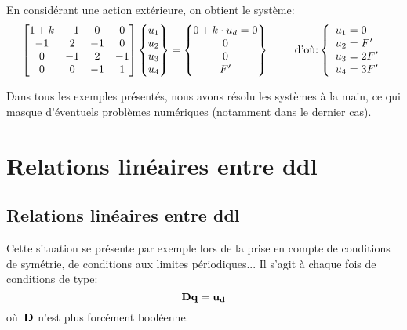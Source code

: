 \medskipvm
En considérant une action extérieure, on obtient le système:
\begin{equation}
\MM*{1+k & -1 & 0 & 0 \\ -1 & 2 & -1 & 0 \\ 0 & -1 & 2 & -1\\ 0&0&-1&1}
\VV*{u_1\\u_2\\u_3\\u_4}
=
\VV*{0+k\cdot u_d = 0\\0\\0\\F'}
\qquad \text{ d'où:} 
\left\{\begin{array}{l} u_1=0 \\ u_2=F' \\ u_3=2F' \\ u_4=3F' \end{array}\right.
\end{equation}


\medskip
Dans tous les exemples présentés, nous avons résolu les systèmes à la main, ce qui masque d'éventuels
problèmes numériques (notamment dans le dernier cas).

\medskip
\ifVersionAvecExemplesSepares
  \section{Relations linéaires entre ddl}
\else
  \subsection{Relations linéaires entre ddl}
\fi
Cette situation se présente par exemple lors de la prise en compte de conditions de symétrie, de conditions aux limites périodiques... Il s'agit à chaque fois de conditions de type:
\begin{equation}
\MM{D}\VV{q} = \VV{u_d}
\end{equation}
où~$\MM{D}$ n'est plus forcément booléenne.

